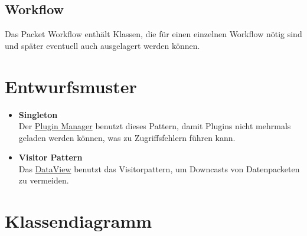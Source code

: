 \subsection{Workflow}
Das Packet Workflow enthält Klassen, die für einen einzelnen Workflow nötig sind und später eventuell auch ausgelagert werden können.
\section{Entwurfsmuster}
\begin{itemize}
	\item \textbf{Singleton}
	\\ Der \hyperref[Workflow:CPluginManager]{Plugin Manager} benutzt dieses Pattern, damit Plugins nicht mehrmals geladen werden können, was zu Zugriffsfehlern führen kann.
	\item \textbf{Visitor Pattern}
	\\ Das \hyperref[Workflow:IDataView]{DataView} benutzt das Visitorpattern, um Downcasts von Datenpacketen zu vermeiden.
\end{itemize}
\section{Klassendiagramm}

